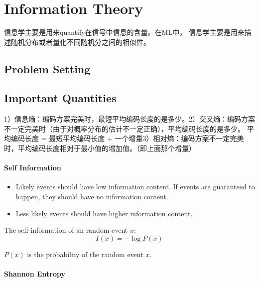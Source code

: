\documentclass{ctexart}
\begin{document}
\tableofcontents


\section{ Information Theory }

信息学主要是用来quantify在信号中信息的含量。在ML中， 信息学主要是用来描述随机分布或者量化不同随机分之间的相似性。

\subsection{Problem Setting}

\subsection{ Important Quantities }

1）信息熵：编码方案完美时，最短平均编码长度的是多少。2）交叉熵：编码方案不一定完美时（由于对概率分布的估计不一定正确），平均编码长度的是多少。              平均编码长度 = 最短平均编码长度 + 一个增量3）相对熵：编码方案不一定完美时，平均编码长度相对于最小值的增加值。（即上面那个增量）

\paragraph{Self Information}

\begin{itemize}
    \item Likely events should have low information content. If events are guaranteed to happen, they should have no information content.
    
    \item Less likely events should have higher information content.
\end{itemize}

The self-information of an random event \( x \): 
\begin{equation}
I(x) = - \log P(x)
\end{equation}

\( P(x) \) is the probability of the random event \( x \).

\paragraph{Shannon Entropy}
\end{document}
